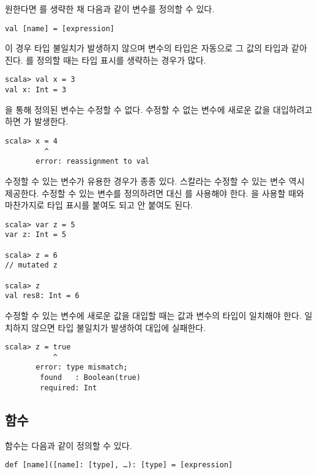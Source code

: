 원한다면 를 생략한 채 다음과 같이 변수를 정의할 수 있다.

\begin{verbatim}
val [name] = [expression]
\end{verbatim}

이 경우 타입 불일치가 발생하지 않으며 변수의 타입은 자동으로 그 값의 타입과
같아진다. 를 정의할 때는 타입 표시를
생략하는 경우가 많다.

\begin{verbatim}
scala> val x = 3
val x: Int = 3
\end{verbatim}

을 통해 정의된 변수는 수정할 수 없다. 수정할 수 없는 변수에 새로운 값을
대입하려고 하면 가 발생한다.

\begin{verbatim}
scala> x = 4
         ^
       error: reassignment to val
\end{verbatim}

수정할 수 있는 변수가 유용한 경우가 종종 있다. 스칼라는 수정할 수 있는 변수 역시
제공한다. 수정할 수 있는 변수를 정의하려면  대신 를 사용해야
한다. 을
사용할 때와 마찬가지로 타입 표시를 붙여도 되고 안 붙여도 된다.

\begin{verbatim}
scala> var z = 5
var z: Int = 5

scala> z = 6
// mutated z

scala> z
val res8: Int = 6
\end{verbatim}

수정할 수 있는 변수에 새로운 값을 대입할 때는 값과 변수의 타입이 일치해야 한다.
일치하지 않으면 타입 불일치가 발생하여 대입에 실패한다.

\begin{verbatim}
scala> z = true
           ^
       error: type mismatch;
        found   : Boolean(true)
        required: Int
\end{verbatim}

\subsection{함수}

함수는 다음과 같이 정의할 수 있다.

\begin{verbatim}
def [name]([name]: [type], …): [type] = [expression]
\end{verbatim}

